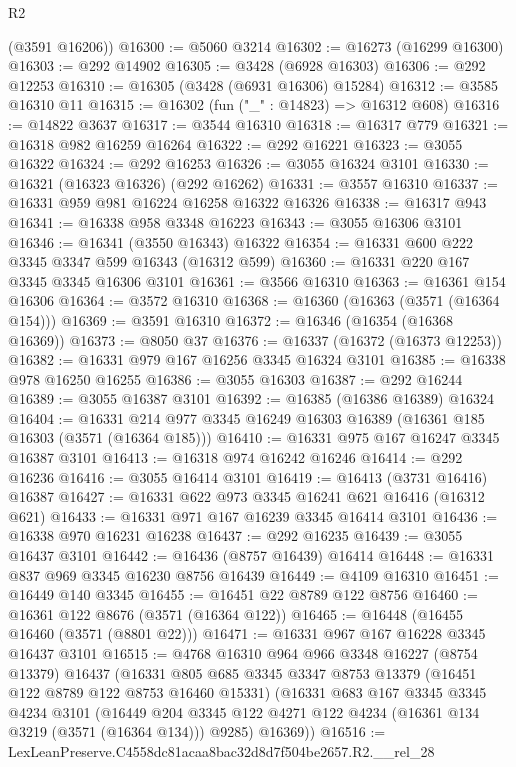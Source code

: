 \begin{lexlean}{R2}
\begin{coremodule}
      (@3591 @16206))
@16300 := @5060 @3214
@16302 := @16273 (@16299 @16300)
@16303 := @292 @14902
@16305 := @3428 (@6928 @16303)
@16306 := @292 @12253
@16310 := @16305 (@3428 (@6931 @16306) @15284)
@16312 := @3585 @16310 @11
@16315 := @16302 (fun ("_" : @14823) => @16312 @608)
@16316 := @14822 @3637
@16317 := @3544 @16310
@16318 := @16317 @779
@16321 := @16318 @982 @16259 @16264
@16322 := @292 @16221
@16323 := @3055 @16322
@16324 := @292 @16253
@16326 := @3055 @16324 @3101
@16330 := @16321 (@16323 @16326) (@292 @16262)
@16331 := @3557 @16310
@16337 := @16331 @959 @981 @16224 @16258 @16322 @16326
@16338 := @16317 @943
@16341 := @16338 @958 @3348 @16223
@16343 := @3055 @16306 @3101
@16346 := @16341 (@3550 @16343) @16322
@16354 := @16331 @600 @222 @3345 @3347 @599 @16343 (@16312 @599)
@16360 := @16331 @220 @167 @3345 @3345 @16306 @3101
@16361 := @3566 @16310
@16363 := @16361 @154 @16306
@16364 := @3572 @16310
@16368 := @16360 (@16363 (@3571 (@16364 @154)))
@16369 := @3591 @16310
@16372 := @16346 (@16354 (@16368 @16369))
@16373 := @8050 @37
@16376 := @16337 (@16372 (@16373 @12253))
@16382 := @16331 @979 @167 @16256 @3345 @16324 @3101
@16385 := @16338 @978 @16250 @16255
@16386 := @3055 @16303
@16387 := @292 @16244
@16389 := @3055 @16387 @3101
@16392 := @16385 (@16386 @16389) @16324
@16404 := @16331 @214 @977 @3345 @16249 @16303 @16389 (@16361 @185 @16303 (@3571 (@16364 @185)))
@16410 := @16331 @975 @167 @16247 @3345 @16387 @3101
@16413 := @16318 @974 @16242 @16246
@16414 := @292 @16236
@16416 := @3055 @16414 @3101
@16419 := @16413 (@3731 @16416) @16387
@16427 := @16331 @622 @973 @3345 @16241 @621 @16416 (@16312 @621)
@16433 := @16331 @971 @167 @16239 @3345 @16414 @3101
@16436 := @16338 @970 @16231 @16238
@16437 := @292 @16235
@16439 := @3055 @16437 @3101
@16442 := @16436 (@8757 @16439) @16414
@16448 := @16331 @837 @969 @3345 @16230 @8756 @16439
@16449 := @4109 @16310
@16451 := @16449 @140 @3345
@16455 := @16451 @22 @8789 @122 @8756
@16460 := @16361 @122 @8676 (@3571 (@16364 @122))
@16465 := @16448 (@16455 @16460 (@3571 (@8801 @22)))
@16471 := @16331 @967 @167 @16228 @3345 @16437 @3101
@16515 := @4768
    @16310
    @964
    @966
    @3348
    @16227
    (@8754 @13379)
    @16437
    (@16331
      @805
      @685
      @3345
      @3347
      @8753
      @13379
      (@16451 @122 @8789 @122 @8753 @16460 @15331)
      (@16331
        @683
        @167
        @3345
        @3345
        @4234
        @3101
        (@16449 @204 @3345 @122 @4271 @122 @4234 (@16361 @134 @3219 (@3571 (@16364 @134))) @9285)
        @16369))
@16516 := LexLeanPreserve.C4558dc81acaa8bac32d8d7f504be2657.R2.__rel_28

\end{coremodule}
\end{lexlean}
